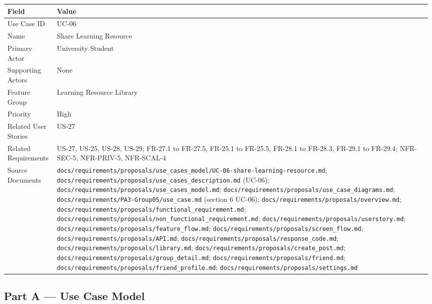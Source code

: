 \documentclass[12pt]{article}
\renewcommand{\baselinestretch}{1.5}
\begin{document}
\begingroup
\small
\renewcommand{\baselinestretch}{1.0}\selectfont
\renewcommand{\arraystretch}{1.15}
\setlength{\tabcolsep}{6pt}
\begin{longtable}{|>{\raggedright\arraybackslash}p{}|>{\raggedright\arraybackslash}p{}|}
\hline
\textbf{Field} & \textbf{Value} \\ \hline
\endhead
Use Case ID & UC-06 \\ \hline
Name & Share Learning Resource \\ \hline
Primary Actor & University Student \\ \hline
Supporting Actors & None \\ \hline
Feature Group & Learning Resource Library \\ \hline
Priority & High \\ \hline
Related User Stories & US-27 \\ \hline
Related Requirements & US-27, US-25, US-28, US-29; FR-27.1 to FR-27.5, FR-25.1 to FR-25.5, FR-28.1 to FR-28.3, FR-29.1 to FR-29.4; NFR-SEC-5, NFR-PRIV-5, NFR-SCAL-4 \\ \hline
Source Documents & \texttt{docs/requirements/proposals/use\_cases\_model/UC-06-share-learning-resource.md}; \texttt{docs/requirements/proposals/use\_cases\_description.md} (UC-06); \texttt{docs/requirements/proposals/use\_cases\_model.md}; \texttt{docs/requirements/proposals/use\_case\_diagrams.md}; \texttt{docs/requirements/PA3-Group05/use\_case.md} (section 6 UC-06); \texttt{docs/requirements/proposals/overview.md}; \texttt{docs/requirements/proposals/functional\_requirement.md}; \texttt{docs/requirements/proposals/non\_functional\_requirement.md}; \texttt{docs/requirements/proposals/userstory.md}; \texttt{docs/requirements/proposals/feature\_flow.md}; \texttt{docs/requirements/proposals/screen\_flow.md}; \texttt{docs/requirements/proposals/API.md}; \texttt{docs/requirements/proposals/response\_code.md}; \texttt{docs/requirements/proposals/library.md}; \texttt{docs/requirements/proposals/create\_post.md}; \texttt{docs/requirements/proposals/group\_detail.md}; \texttt{docs/requirements/proposals/friend.md}; \texttt{docs/requirements/proposals/friend\_profile.md}; \texttt{docs/requirements/proposals/settings.md} \\ \hline
\end{longtable}
\endgroup
\par\medskip

\hypertarget{sec:part-a-use-case-model}{}
\subsection*{Part A --- Use Case Model}
\par\medskip
\end{document}
